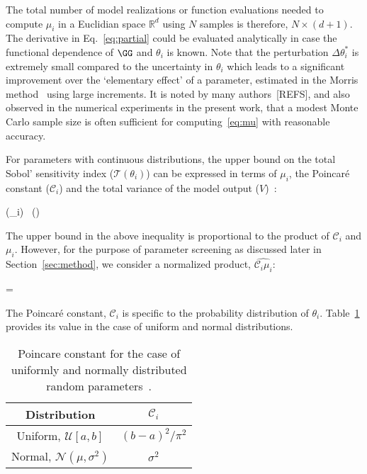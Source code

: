 The total number of model realizations or function evaluations
needed to
compute $\mu_i$ in a Euclidian space $\mathbb{R}^d$ using $N$ samples is
therefore, $N\times(d+1)$. The derivative in Eq.~\ref{eq:partial} could be evaluated
analytically in case the functional dependence of $\GG$ and $\theta_i$
is known. Note that the perturbation $\Delta\theta_i^{*}$ is extremely small 
compared to the uncertainty in $\theta_i$ which leads to a significant improvement
over the `elementary effect' of a parameter, estimated in the Morris method~\cite{Morris:1991}
using large increments.  It is noted by many authors~[REFS], and also observed
in the numerical experiments in the present work, that a modest Monte Carlo
sample size is often sufficient for computing~\eqref{eq:mu} with reasonable
accuracy.

For parameters with continuous distributions, the upper bound on the total 
Sobol' sensitivity index ($\mathcal{T}(\theta_i)$)
can be expressed in terms of $\mu_i$, the Poincar\'e constant ($\mathcal{C}_i$) and the total 
variance of the model output ($V$)~\cite{Lamboni:2013}:

\be
{}(\theta_i) \leq {}~(\propto {})
\label{eq:bound}
\ee

\noindent The upper bound in the above inequality is proportional to the product of $\mathcal{C}_i$
and $\mu_i$. However, for the purpose of parameter screening as discussed later in
Section~\ref{sec:method}, we consider a normalized product, $\widehat{\mathcal{C}_i\mu_i}$:

\be
{} = 
\label{eq:cmu}
\ee

\noindent The Poincar\'e constant, $\mathcal{C}_i$ is specific to the probability distribution of $\theta_i$.
Table~\ref{tab:poincare} provides its value in the case of uniform and normal
distributions.
\bigskip

\begin{table}[htbp]
\renewcommand*{\arraystretch}{1.2}
\begin{center}
\begin{tabular}{|c|c|}
\hline
Distribution & $\mathcal{C}_i$ \\ \hline \hline 
Uniform, $\mathcal{U}[a, b]$ & $(b-a)^{2}/\pi^2$ \\ 
Normal, $\mathcal{N}(\mu,\sigma^2)$ & $\sigma^2$ \\ 
\hline
\end{tabular}
\end{center}

\caption{Poincare constant for the case of uniformly and normally distributed random
parameters~\cite{Roustant:2014}.}
\label{tab:poincare}
\end{table}

